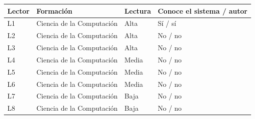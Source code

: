 \begin{tabular}{@{}llll@{}}
\toprule
Lector & Formación & Lectura & Conoce el sistema / autor \\
\midrule
L1 & Ciencia de la Computación & Alta & Sí / sí \\
L2 & Ciencia de la Computación & Alta & No / no \\
L3 & Ciencia de la Computación & Alta & No / no \\
L4 & Ciencia de la Computación & Media & No / no \\
L5 & Ciencia de la Computación & Media & No / no \\
L6 & Ciencia de la Computación & Media & No / no \\
L7 & Ciencia de la Computación & Baja & No / no \\
L8 & Ciencia de la Computación & Baja & No / no \\
\bottomrule
\end{tabular}
